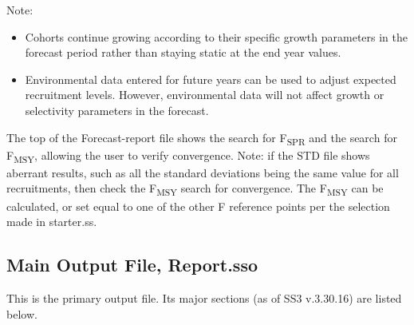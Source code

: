 Note:
\begin{itemize}
	\item Cohorts continue growing according to their specific growth parameters in the forecast period rather than staying static at the end year values.
	\item Environmental data entered for future years can be used to adjust expected recruitment levels.  However, environmental data will not affect growth or selectivity parameters in the forecast.
\end{itemize}

The top of the Forecast-report file shows the search for F\textsubscript {SPR}  and the search for F\textsubscript {MSY}, allowing the user to verify convergence. Note: if the STD file shows aberrant results, such as all the standard deviations being the same value for all recruitments, then check the F\textsubscript {MSY} search for convergence. The F\textsubscript {MSY} can be calculated, or set equal to one of the other F reference points per the selection made in starter.ss.


\subsection{Main Output File, Report.sso}
This is the primary output file.  Its major sections (as of SS3 v.3.30.16) are listed below.  

